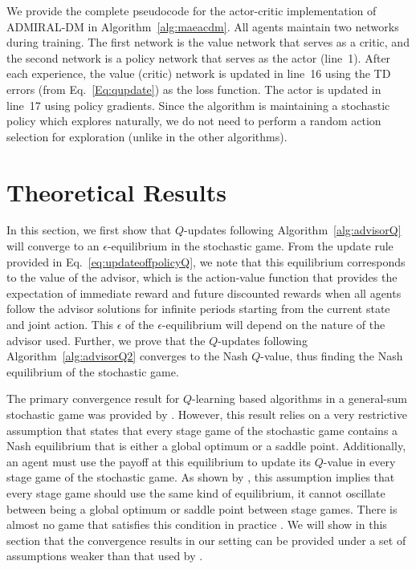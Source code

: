 \documentclass[jair, twoside,11pt,theapa]{article}
\begin{document}
We provide the complete pseudocode for the actor-critic implementation of ADMIRAL-DM in Algorithm~\ref{alg:maeacdm}. 
All agents maintain two networks during training. The first network is the value network that serves as a critic, and the second network is a policy network that serves as the actor (line~1).  After each experience, the value (critic) network is updated in line~16 using the TD errors (from Eq.~\ref{Eq:qupdate}) as the loss function. The actor is updated in line~17 using policy gradients. Since the algorithm is maintaining a stochastic policy which explores naturally, we do not need to perform a random action selection for exploration  (unlike in the other algorithms).  







\section{Theoretical Results}\label{sec:theoriticalresults}

In this section, we first show that $Q$-updates following Algorithm~\ref{alg:advisorQ} will converge to an $\epsilon$-equilibrium in the stochastic game. From the update rule provided in Eq.~\ref{eq:updateoffpolicyQ}, we note that this equilibrium corresponds to the value of the advisor, which is the action-value function that provides the expectation of immediate reward and future discounted rewards when all agents follow the advisor solutions for infinite periods starting from the current state and joint action. This $\epsilon$ of the $\epsilon$-equilibrium will depend on the nature of the advisor used. Further, we prove that the $Q$-updates following Algorithm~\ref{alg:advisorQ2} converges to the Nash $Q$-value, thus finding the Nash equilibrium of the stochastic game. 

The primary convergence result for $Q$-learning based algorithms in a general-sum stochastic game was provided by \citet{hu2003nash}. However, this result relies on a very restrictive assumption that states that every stage game of the stochastic game contains a Nash equilibrium that is either a global optimum or a saddle point. Additionally, an agent must use the payoff at this equilibrium to update its $Q$-value in every stage game of the stochastic game. As shown by \citet{bowling2000convergence}, this assumption implies that every stage game should use the same kind of equilibrium, it cannot oscillate between being a global optimum or saddle point between stage games. There is almost no game that satisfies this condition in practice \citep{hu2003nash}. We will show in this section that the convergence results in our setting can be provided under a set of assumptions weaker than that used by \citet{hu2003nash}.   
\end{document}
